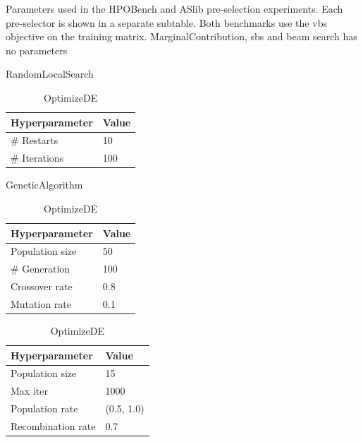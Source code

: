 \begin{table}[!htbp]
  \centering
  \caption[Pre-selection experiment parameters]{Parameters used in the HPOBench and ASlib pre-selection experiments. Each pre-selector is shown in a separate subtable. Both benchmarks use the \gls{vbs} objective on the training matrix. MarginalContribution, \gls{sbs} and beam search has no parameters}
  \label{tab:aslib_preselection_hyperparameters}

  \begin{subtable}[t]{0.48\textwidth}
    \centering
    \caption{RandomLocalSearch}
    \begin{tabular}{ll}
      \toprule
      Hyperparameter & Value \\
      \midrule
      \# Restarts &  10 \\
      \# Iterations & 100 \\
      \bottomrule
    \end{tabular}%
  \end{subtable}
  \hfill
  \begin{subtable}[t]{0.48\textwidth}
    \centering
    \caption{GeneticAlgorithm}
    \begin{tabular}{ll}
      \toprule
      Hyperparameter & Value \\
      \midrule
      Population size & 50 \\
      \# Generation & 100 \\
      Crossover rate & 0.8 \\
      Mutation rate & 0.1 \\
      \bottomrule
    \end{tabular}%
  \end{subtable}
  \hfill
  \begin{subtable}[t]{0.30\textwidth}
    \centering
    \caption{OptimizeDE}
    \begin{tabular}{ll}
      \toprule
      Hyperparameter & Value \\
      \midrule
      Population size & 15 \\
      Max iter & 1000\\
      Population rate & (0.5, 1.0) \\
      Recombination rate & 0.7 \\
      \bottomrule
    \end{tabular}%
  \end{subtable}
\end{table}

